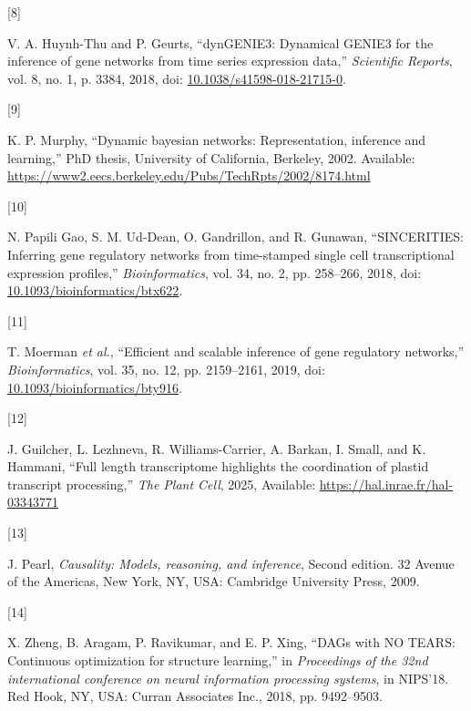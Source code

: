 \documentclass[
]{article}
\newlength{\cslhangindent}
\newlength{\csllabelwidth}
\newenvironment{CSLReferences}[2] %
 {\begin{list}{}{%
  \setlength{\itemindent}{0pt}
  \setlength{\leftmargin}{0pt}
  \setlength{\parsep}{0pt}
  \ifodd #1
   \setlength{\leftmargin}{\cslhangindent}
   \setlength{\itemindent}{-1\cslhangindent}
  \fi
  \setlength{\itemsep}{#2\baselineskip}}}
 {\end{list}}
\newcommand{\CSLLeftMargin}[1]{\parbox[t]{\csllabelwidth}{\strut#1\strut}}
\newcommand{\CSLRightInline}[1]{\parbox[t]{\linewidth - \csllabelwidth}{\strut#1\strut}}
\theoremstyle{definition}
\theoremstyle{remark}
\begin{document}
\begin{CSLReferences}{0}{0}
\CSLLeftMargin{{[}8{]} }%
\CSLRightInline{V. A. Huynh-Thu and P. Geurts, {``dynGENIE3: Dynamical
{GENIE3} for the inference of gene networks from time series expression
data,''} \emph{Scientific Reports}, vol. 8, no. 1, p. 3384, 2018, doi:
\href{https://doi.org/10.1038/s41598-018-21715-0}{10.1038/s41598-018-21715-0}.}

\CSLLeftMargin{{[}9{]} }%
\CSLRightInline{K. P. Murphy, {``Dynamic bayesian networks:
Representation, inference and learning,''} PhD thesis, University of
California, Berkeley, 2002. Available:
\url{https://www2.eecs.berkeley.edu/Pubs/TechRpts/2002/8174.html}}

\CSLLeftMargin{{[}10{]} }%
\CSLRightInline{N. Papili Gao, S. M. Ud-Dean, O. Gandrillon, and R.
Gunawan, {``SINCERITIES: Inferring gene regulatory networks from
time-stamped single cell transcriptional expression profiles,''}
\emph{Bioinformatics}, vol. 34, no. 2, pp. 258--266, 2018, doi:
\href{https://doi.org/10.1093/bioinformatics/btx622}{10.1093/bioinformatics/btx622}.}

\CSLLeftMargin{{[}11{]} }%
\CSLRightInline{T. Moerman \emph{et al.}, {``Efficient and scalable
inference of gene regulatory networks,''} \emph{Bioinformatics}, vol.
35, no. 12, pp. 2159--2161, 2019, doi:
\href{https://doi.org/10.1093/bioinformatics/bty916}{10.1093/bioinformatics/bty916}.}

\CSLLeftMargin{{[}12{]} }%
\CSLRightInline{J. Guilcher, L. Lezhneva, R. Williams-Carrier, A.
Barkan, I. Small, and K. Hammani, {``Full length transcriptome
highlights the coordination of plastid transcript processing,''}
\emph{The Plant Cell}, 2025, Available:
\url{https://hal.inrae.fr/hal-03343771}}

\CSLLeftMargin{{[}13{]} }%
\CSLRightInline{J. Pearl, \emph{Causality: Models, reasoning, and
inference}, Second edition. 32 Avenue of the Americas, New York, NY,
USA: Cambridge University Press, 2009.}

\CSLLeftMargin{{[}14{]} }%
\CSLRightInline{X. Zheng, B. Aragam, P. Ravikumar, and E. P. Xing,
{``DAGs with NO TEARS: Continuous optimization for structure
learning,''} in \emph{Proceedings of the 32nd international conference
on neural information processing systems}, in NIPS'18. Red Hook, NY,
USA: Curran Associates Inc., 2018, pp. 9492--9503.}


\end{CSLReferences}
\end{document}
